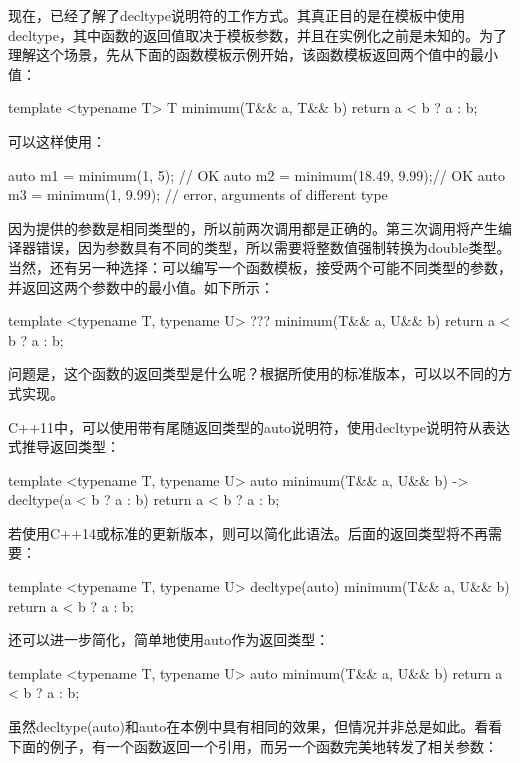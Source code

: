 现在，已经了解了decltype说明符的工作方式。其真正目的是在模板中使用decltype，其中函数的返回值取决于模板参数，并且在实例化之前是未知的。为了理解这个场景，先从下面的函数模板示例开始，该函数模板返回两个值中的最小值：

\begin{cpp}
template <typename T>
T minimum(T&& a, T&& b)
{
	return a < b ? a : b;
}
\end{cpp}

可以这样使用：

\begin{cpp}
auto m1 = minimum(1, 5); // OK
auto m2 = minimum(18.49, 9.99);// OK
auto m3 = minimum(1, 9.99);
                    // error, arguments of different type
\end{cpp}

因为提供的参数是相同类型的，所以前两次调用都是正确的。第三次调用将产生编译器错误，因为参数具有不同的类型，所以需要将整数值强制转换为double类型。当然，还有另一种选择：可以编写一个函数模板，接受两个可能不同类型的参数，并返回这两个参数中的最小值。如下所示：

\begin{cpp}
template <typename T, typename U>
??? minimum(T&& a, U&& b)
{
	return a < b ? a : b;
}
\end{cpp}

问题是，这个函数的返回类型是什么呢？根据所使用的标准版本，可以以不同的方式实现。

C++11中，可以使用带有尾随返回类型的auto说明符，使用decltype说明符从表达式推导返回类型：

\begin{cpp}
template <typename T, typename U>
auto minimum(T&& a, U&& b) -> decltype(a < b ? a : b)
{
	return a < b ? a : b;
}
\end{cpp}

若使用C++14或标准的更新版本，则可以简化此语法。后面的返回类型将不再需要：

\begin{cpp}
template <typename T, typename U>
decltype(auto) minimum(T&& a, U&& b)
{
	return a < b ? a : b;
}
\end{cpp}

还可以进一步简化，简单地使用auto作为返回类型：

\begin{cpp}
template <typename T, typename U>
auto minimum(T&& a, U&& b)
{
	return a < b ? a : b;
}
\end{cpp}

虽然decltype(auto)和auto在本例中具有相同的效果，但情况并非总是如此。看看下面的例子，有一个函数返回一个引用，而另一个函数完美地转发了相关参数：

